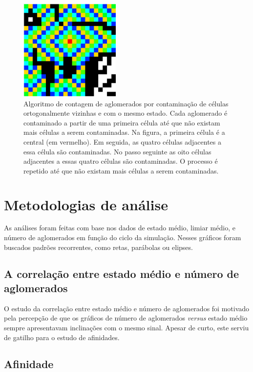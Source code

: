 \documentclass[
	12pt,				%
	openright,			%
	twoside,			%
	a4paper,			%
	english,			%
	french,				%
	spanish,			%
	brazil				%
	]{abntex2}
\begin{document}
\begin{figure}
    \centering
    \includegraphics[width=5cm]{contamination.png}
    \caption{Algoritmo de contagem de aglomerados por contaminação de células ortogonalmente vizinhas e com o mesmo estado. Cada aglomerado é contaminado a partir de uma primeira célula até que não existam mais células a serem contaminadas. Na figura, a primeira célula é a central (em vermelho). Em seguida, as quatro células adjacentes a essa célula são contaminadas. No passo seguinte as oito células adjacentes a essas quatro células são contaminadas. O processo é repetido até que não existam mais células a serem contaminadas.}
    \label{fig:contamination}
\end{figure}



\section{Metodologias de análise}

As análises foram feitas com base nos dados de estado médio, limiar médio, e número de aglomerados em função do ciclo da simulação. Nesses gráficos foram buscados padrões recorrentes, como retas, parábolas ou elipses.

\subsection{A correlação entre estado médio e número de aglomerados}

O estudo da correlação entre estado médio e número de aglomerados foi motivado pela percepção de que os gráficos de número de aglomerados \textit{versus} estado médio sempre apresentavam inclinações com o mesmo sinal. Apesar de curto, este serviu de gatilho para o estudo de afinidades.

\subsection{Afinidade}
\end{document}
